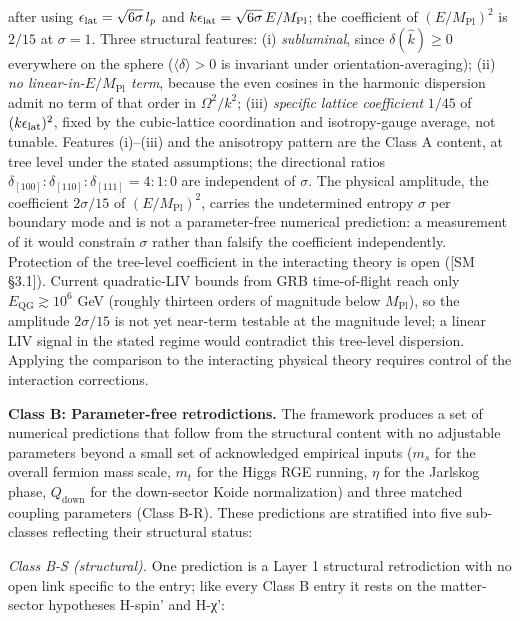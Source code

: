 \documentclass[
]{article}
\begin{document}
\begin{itemize}
  after using \(\epsilon_{\rm lat} = \sqrt{6\sigma}\,l_p\) and
  \(k\epsilon_{\rm lat} = \sqrt{6\sigma}\,E/M_{\text{Pl}}\); the
  coefficient of \((E/M_{\text{Pl}})^2\) is \(2/15\) at \(\sigma = 1\).
  Three structural features: (i) \emph{subluminal}, since
  \(\delta(\hat k) \geq 0\) everywhere on the sphere
  (\(\langle\delta\rangle > 0\) is invariant under
  orientation-averaging); (ii) \emph{no linear-in-\(E/M_{\text{Pl}}\)
  term}, because the even cosines in the harmonic dispersion admit no
  term of that order in \(\Omega^2/k^2\); (iii) \emph{specific lattice
  coefficient} \(1/45\) of \((k\epsilon_{\rm lat})^2\), fixed by the
  cubic-lattice coordination and isotropy-gauge average, not tunable.
  Features (i)--(iii) and the anisotropy pattern are the Class A
  content, at tree level under the stated assumptions; the directional
  ratios
  \(\delta_{[100]} : \delta_{[110]} : \delta_{[111]} = 4 : 1 : 0\) are
  independent of \(\sigma\). The physical amplitude, the coefficient
  \(2\sigma/15\) of \((E/M_{\text{Pl}})^2\), carries the undetermined
  entropy \(\sigma\) per boundary mode and is not a parameter-free
  numerical prediction: a measurement of it would constrain \(\sigma\)
  rather than falsify the coefficient independently. Protection of the
  tree-level coefficient in the interacting theory is open ({[}SM
  §3.1{]}). Current quadratic-LIV bounds from GRB time-of-flight reach
  only \(E_{\text{QG}} \gtrsim 10^6\) GeV (roughly thirteen orders of
  magnitude below \(M_{\text{Pl}}\)), so the amplitude \(2\sigma/15\) is
  not yet near-term testable at the magnitude level; a linear LIV signal
  in the stated regime would contradict this tree-level dispersion.
  Applying the comparison to the interacting physical theory requires
  control of the interaction corrections.
\end{itemize}

\textbf{Class B: Parameter-free retrodictions.} The framework produces a
set of numerical predictions that follow from the structural content
with no adjustable parameters beyond a small set of acknowledged
empirical inputs (\(m_s\) for the overall fermion mass scale, \(m_t\)
for the Higgs RGE running, \(\eta\) for the Jarlskog phase,
\(Q_{\text{down}}\) for the down-sector Koide normalization) and three
matched coupling parameters (Class B-R). These predictions are
stratified into five sub-classes reflecting their structural status:

\emph{Class B-S (structural).} One prediction is a Layer 1 structural
retrodiction with no open link specific to the entry; like every Class B
entry it rests on the matter-sector hypotheses H-spin' and H-χ':
\end{document}
